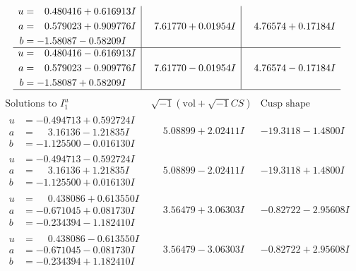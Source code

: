 \documentclass[1p]{elsarticle_modified}
\theoremstyle{definition}
\newcommand{\I}{\sqrt{-1}}
\begin{document}
$$\begin{array}{c|c|c}
\begin{aligned}
u &= \phantom{-}0.480416 + 0.616913 I \\
a &= \phantom{-}0.579023 + 0.909776 I \\
b &= -1.58087 - 0.58209 I\end{aligned}
 & \phantom{-}7.61770 + 0.01954 I & \phantom{-}4.76574 + 0.17184 I \\ \hline\begin{aligned}
u &= \phantom{-}0.480416 - 0.616913 I \\
a &= \phantom{-}0.579023 - 0.909776 I \\
b &= -1.58087 + 0.58209 I\end{aligned}
 & \phantom{-}7.61770 - 0.01954 I & \phantom{-}4.76574 - 0.17184 I\\
 \hline 
 \end{array}$$\newpage$$\begin{array}{c|c|c}  
\text{Solutions to }I^u_{1}& \I (\text{vol} + \sqrt{-1}CS) & \text{Cusp shape}\\
 \hline 
\begin{aligned}
u &= -0.494713 + 0.592724 I \\
a &= \phantom{-}3.16136 - 1.21835 I \\
b &= -1.125500 - 0.016130 I\end{aligned}
 & \phantom{-}5.08899 + 2.02411 I & -19.3118 - 1.4800 I \\ \hline\begin{aligned}
u &= -0.494713 - 0.592724 I \\
a &= \phantom{-}3.16136 + 1.21835 I \\
b &= -1.125500 + 0.016130 I\end{aligned}
 & \phantom{-}5.08899 - 2.02411 I & -19.3118 + 1.4800 I \\ \hline\begin{aligned}
u &= \phantom{-}0.438086 + 0.613550 I \\
a &= -0.671045 + 0.081730 I \\
b &= -0.234394 - 1.182410 I\end{aligned}
 & \phantom{-}3.56479 + 3.06303 I & -0.82722 - 2.95608 I \\ \hline\begin{aligned}
u &= \phantom{-}0.438086 - 0.613550 I \\
a &= -0.671045 - 0.081730 I \\
b &= -0.234394 + 1.182410 I\end{aligned}
 & \phantom{-}3.56479 - 3.06303 I & -0.82722 + 2.95608 I \\ \hline\begin{aligned}

\end{aligned}
\end{array}$$
\end{document}
